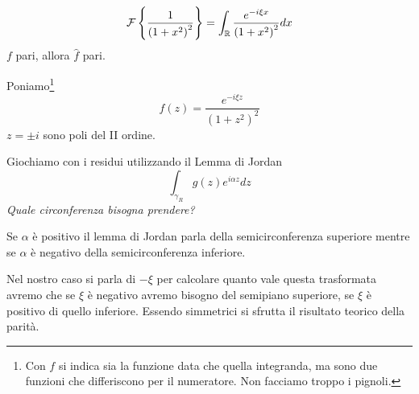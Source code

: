 \begin{equation*}
\mathcal{F} \left\{\frac{1}{\left(1 + x^{2}\right)^{2}}\right\} = \int _{\mathbb{R} }\frac{e^{ - i\xi x}}{\left(1 + x^{2}\right)^{2}} dx
\end{equation*}
$f$ pari, allora $\hat{f}$ pari.

Poniamo\footnote{Con $f$ si indica sia la funzione data che quella integranda, ma sono due funzioni che differiscono per il numeratore. Non facciamo troppo i pignoli.}
\begin{equation*}
f(z) = \frac{e^{ - i\xi z}}{\left(1 + z^{2}\right)^{2}}
\end{equation*}
$z = \pm i$ sono poli del II ordine.

Giochiamo con i residui utilizzando il Lemma di Jordan
\begin{equation*}
\int _{\gamma _{R}} g(z) e^{i\alpha z} dz
\end{equation*}
\textit{Quale circonferenza bisogna prendere?}

Se $\alpha $ è positivo il lemma di Jordan parla della semicirconferenza superiore mentre se $\alpha $ è negativo della semicirconferenza inferiore.

Nel nostro caso si parla di $ - \xi $ per calcolare quanto vale questa trasformata avremo che se $\xi $ è negativo avremo bisogno del semipiano superiore, se $\xi $ è positivo di quello inferiore. Essendo simmetrici si sfrutta il risultato teorico della parità.


